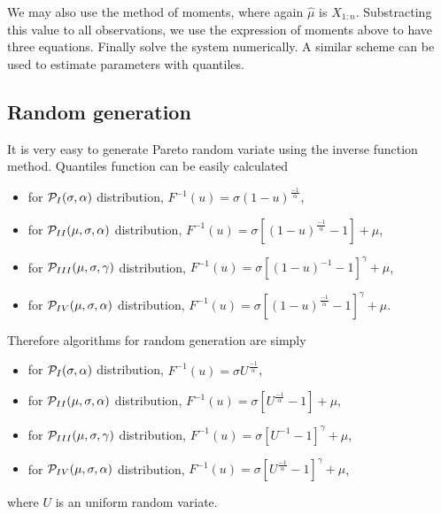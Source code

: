 We may also use the method of moments, where again $\hat \mu$ is $X_{1:n}$. Substracting this value to all observations, we use the expression of moments above to have three equations. Finally solve the system numerically. A similar scheme can be used to estimate parameters with quantiles.



\subsection{Random generation}
It is very easy to generate Pareto random variate using the inverse function method. Quantiles function can be easily calculated
\begin{itemize}
\item for $\mathcal P_{I}(\sigma, \alpha)$ distribution, $F^{-1}(u) = \sigma(1-u)^{\frac{-1}{\alpha}}$,
\item for $\mathcal P_{II}(\mu,\sigma, \alpha)$ distribution, $F^{-1}(u) = \sigma\left[(1-u)^{\frac{-1}{\alpha}} -1\right]+\mu$,
\item for $\mathcal P_{III}(\mu,\sigma, \gamma)$ distribution, $F^{-1}(u) = \sigma\left[(1-u)^{-1} -1\right]^\gamma+\mu$,
\item for $\mathcal P_{IV}(\mu,\sigma, \alpha)$ distribution, $F^{-1}(u) = \sigma\left[(1-u)^{\frac{-1}{\alpha}} -1\right]^\gamma+\mu$.
\end{itemize}
Therefore algorithms for random generation are simply
\begin{itemize}
\item for $\mathcal P_{I}(\sigma, \alpha)$ distribution, $F^{-1}(u) = \sigma U^{\frac{-1}{\alpha}}$,
\item for $\mathcal P_{II}(\mu,\sigma, \alpha)$ distribution, $F^{-1}(u) = \sigma\left[U^{\frac{-1}{\alpha}} -1\right]+\mu$,
\item for $\mathcal P_{III}(\mu,\sigma, \gamma)$ distribution, $F^{-1}(u) = \sigma\left[U^{-1} -1\right]^\gamma+\mu$,
\item for $\mathcal P_{IV}(\mu,\sigma, \alpha)$ distribution, $F^{-1}(u) = \sigma\left[U^{\frac{-1}{\alpha}} -1\right]^\gamma+\mu$,
\end{itemize}
where $U$ is an uniform random variate.


